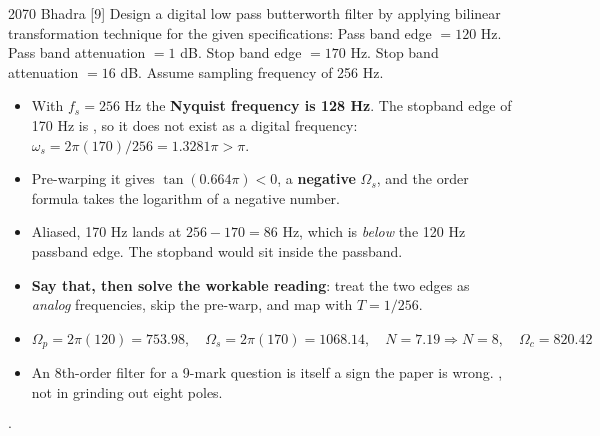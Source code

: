  {\color{sub}\footnotesize {}}
\begin{asked}{2070 Bhadra \textperiodcentered{} [9]}
Design a digital low pass butterworth filter by applying bilinear transformation
technique for the given specifications: Pass band edge $=120$ Hz. Pass band attenuation
$=1$ dB. Stop band edge $=170$ Hz. Stop band attenuation $=16$ dB. Assume sampling
frequency of 256 Hz.
\end{asked}
\begin{itemize}
  \item With $f_s=256$ Hz the \textbf{Nyquist frequency is 128 Hz}. The stopband edge of
        170 Hz is , so it does not exist as a digital frequency:
        $\omega_s=2\pi(170)/256=1.3281\pi>\pi$.
  \item Pre-warping it gives $\tan(0.664\pi)<0$, a \textbf{negative} $\Omega_s$, and the
        order formula takes the logarithm of a negative number. 
  \item Aliased, 170 Hz lands at $256-170=86$ Hz, which is \emph{below} the 120 Hz
        passband edge. The stopband would sit inside the passband.
  \item \textbf{Say that, then solve the workable reading}: treat the two edges as
        \emph{analog} frequencies, skip the pre-warp, and map with $T=1/256$.
  \item[] \[ \Omega_p=2\pi(120)=753.98,\quad \Omega_s=2\pi(170)=1068.14,\quad
             N=7.19\Rightarrow\boxed{N=8},\quad \Omega_c=820.42 \]
  \item An 8th-order filter for a 9-mark question is itself a sign the paper is wrong.
        , not in grinding out eight poles.
\end{itemize}

{\color{sub}\footnotesize {}  \gap$\cdot$\gap {}}

